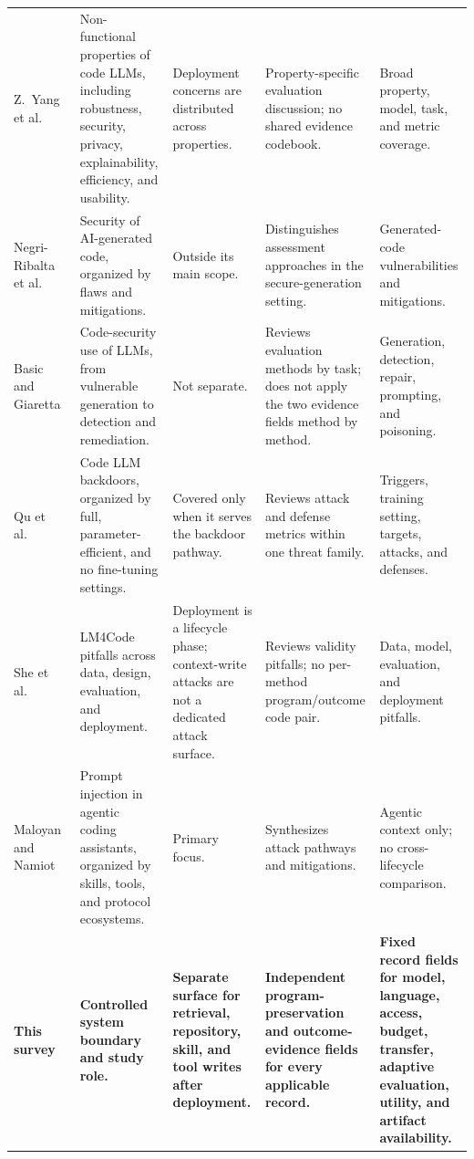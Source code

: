 \documentclass[acmsmall,screen,review]{acmart}
\begin{document}
{\begin{longtable}{@{}L{2.00cm} L{2.80cm} L{2.70cm} L{2.80cm} L{2.90cm}@{}}
Z.~Yang et al.~\cite{robustness2024llms} & Non-functional properties of code LLMs, including robustness, security, privacy, explainability, efficiency, and usability. & Deployment concerns are distributed across properties. & Property-specific evaluation discussion; no shared evidence codebook. & Broad property, model, task, and metric coverage. \\
Negri-Ribalta et al.~\cite{negriribalta2024securegeneration} & Security of AI-generated code, organized by flaws and mitigations. & Outside its main scope. & Distinguishes assessment approaches in the secure-generation setting. & Generated-code vulnerabilities and mitigations. \\
Basic and Giaretta~\cite{basic2026codesecurity} & Code-security use of LLMs, from vulnerable generation to detection and remediation. & Not separate. & Reviews evaluation methods by task; does not apply the two evidence fields method by method. & Generation, detection, repair, prompting, and poisoning. \\
Qu et al.~\cite{qu2025backdoorsurvey} & Code LLM backdoors, organized by full, parameter-efficient, and no fine-tuning settings. & Covered only when it serves the backdoor pathway. & Reviews attack and defense metrics within one threat family. & Triggers, training setting, targets, attacks, and defenses. \\
She et al.~\cite{she2026pitfalls} & LM4Code pitfalls across data, design, evaluation, and deployment. & Deployment is a lifecycle phase; context-write attacks are not a dedicated attack surface. & Reviews validity pitfalls; no per-method program/outcome code pair. & Data, model, evaluation, and deployment pitfalls. \\
Maloyan and Namiot~\cite{maloyan2026promptinjection} & Prompt injection in agentic coding assistants, organized by skills, tools, and protocol ecosystems. & Primary focus. & Synthesizes attack pathways and mitigations. & Agentic context only; no cross-lifecycle comparison. \\
\textbf{This survey} & \textbf{Controlled system boundary and study role.} & \textbf{Separate surface for retrieval, repository, skill, and tool writes after deployment.} & \textbf{Independent program-preservation and outcome-evidence fields for every applicable record.} & \textbf{Fixed record fields for model, language, access, budget, transfer, adaptive evaluation, utility, and artifact availability.} \\
\end{longtable}
}
\end{document}
